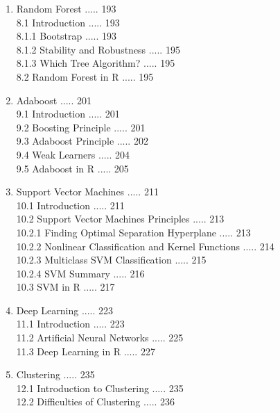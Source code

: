 \documentclass[10pt]{book}
\begin{document}
\begin{enumerate}
7.3 C5 Tree Generator in R ..... 181\\
7.3.1 Generating a Tree ..... 181\\
7.3.2 Information Acquired from C5-Tree ..... 184\\
7.3.3 Using Testing Samples to Assess Tree Accuracy ..... 187\\
7.3.4 Using Cross-Validation to Assess Tree Accuracy ..... 188\\
7.3.5 Generating Decision Rules ..... 189
  \item Random Forest ..... 193\\
8.1 Introduction ..... 193\\
8.1.1 Bootstrap ..... 193\\
8.1.2 Stability and Robustness ..... 195\\
8.1.3 Which Tree Algorithm? ..... 195\\
8.2 Random Forest in R ..... 195
  \item Adaboost ..... 201\\
9.1 Introduction ..... 201\\
9.2 Boosting Principle ..... 201\\
9.3 Adaboost Principle ..... 202\\
9.4 Weak Learners ..... 204\\
9.5 Adaboost in R ..... 205
  \item Support Vector Machines ..... 211\\
10.1 Introduction ..... 211\\
10.2 Support Vector Machines Principles ..... 213\\
10.2.1 Finding Optimal Separation Hyperplane ..... 213\\
10.2.2 Nonlinear Classification and Kernel Functions ..... 214\\
10.2.3 Multiclass SVM Classification ..... 215\\
10.2.4 SVM Summary ..... 216\\
10.3 SVM in R ..... 217
  \item Deep Learning ..... 223\\
11.1 Introduction ..... 223\\
11.2 Artificial Neural Networks ..... 225\\
11.3 Deep Learning in R ..... 227
  \item Clustering ..... 235\\
12.1 Introduction to Clustering ..... 235\\
12.2 Difficulties of Clustering ..... 236\\

\end{enumerate}
\end{document}

